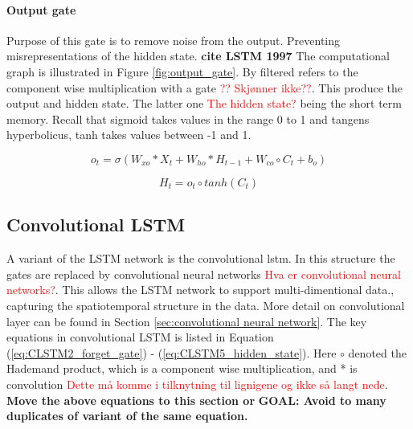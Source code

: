 \documentclass{article}
\begin{document}
\paragraph{Output gate}  \label{sec:output_gate}
Purpose of this gate is to remove noise from the output. Preventing misrepresentations of the hidden state. \textbf{cite LSTM 1997} The computational graph is illustrated in Figure \ref{fig:output_gate}.
By filtered refers to the component wise multiplication with a gate \textcolor{red}{?? Skjønner ikke??}. This produce the output and hidden state. The latter one \textcolor{red}{The hidden state?} being the short term memory. Recall that sigmoid takes values in the range 0 to 1 and tangens hyperbolicus, tanh takes values between -1 and 1.

\begin{equation} \label{eq:CLSTM4_output_gate}
        o_t = \sigma \left( W_{xo}*X_t + W_{ho}*H_{t-1} + W_{co}\circ C_{t}+b_o \right)
\end{equation}

\begin{equation} \label{eq:CLSTM5_hidden_state}
        H_t = o_t \circ tanh \left( C_t \right)
\end{equation}

\subsection{Convolutional LSTM}  \label{sec:convolutional_lstm}
A variant of the LSTM network is the convolutional lstm. In this structure the gates are replaced by convolutional neural networks \textcolor{red}{Hva er convolutional neural networks?}. This allows the LSTM network to support multi-dimentional data., capturing the spatiotemporal structure in the data. 
More detail on convolutional layer can be found in Section \ref{sec:convolutional neural network}. The key equations in convolutional LSTM is listed in Equation (\ref{eq:CLSTM2_forget_gate}) - (\ref{eq:CLSTM5_hidden_state}). Here $\circ$ denoted the Hademand product, which is a component wise multiplication, and * is convolution \textcolor{red}{Dette må komme i tilknytning til lignigene og ikke så langt nede}. \textbf{Move the above equations to this section or }
\textbf{GOAL: Avoid to many duplicates of variant of the same equation. }
\end{document}
